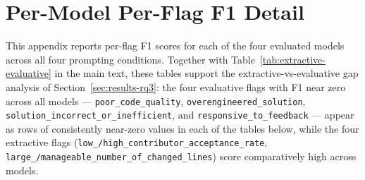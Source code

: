\section{Per-Model Per-Flag F1 Detail}\label{sec:perflag-appendix}

This appendix reports per-flag F1 scores for each of the four evaluated
models across all four prompting conditions.  Together with
Table~\ref{tab:extractive-evaluative} in the main text, these tables
support the extractive-vs-evaluative gap analysis of
Section~\ref{sec:results-rq3}: the four evaluative flags with F1 near
zero across all models --- \texttt{poor\_code\_quality},
\texttt{overengineered\_solution},
\texttt{solution\_incorrect\_or\_inefficient}, and
\texttt{responsive\_to\_feedback} --- appear as rows of consistently
near-zero values in each of the tables below, while the four extractive
flags (\texttt{low\_/high\_contributor\_acceptance\_rate},
\texttt{large\_/manageable\_number\_of\_changed\_lines}) score
comparatively high across models.

\FloatBarrier


